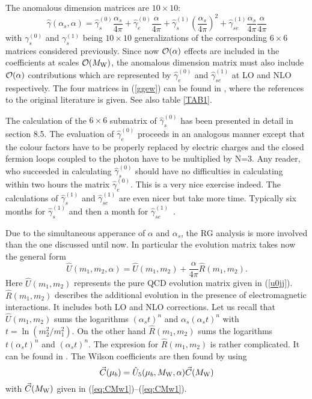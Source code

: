 \documentclass[12pt]{article}
\def\as{\alpha_s}
\newcommand{\mw}{M_{\rm W}}
\newcommand{\be}{\begin{equation}}
\newcommand{\ee}{\end{equation}}
\newcommand{\ord}{{\cal O}}
\def\aspi{\frac{\as}{4\pi}}
\begin{document}
\begin{itemize}
\begin{itemize}
The anomalous dimension matrices are $10\times 10$:
\begin{equation}\label{ggew}
\hat\gamma(\as,\alpha)=\hat\gamma_s^{(0)}\aspi + 
\hat\gamma_e^{(0)}\frac{\alpha}{4\pi}+ 
\hat\gamma_s^{(1)}\left(\aspi\right)^2+
\hat\gamma_{se}^{(1)}\aspi\frac{\alpha}{4\pi}
\end{equation}
with $\gamma_s^{(0)}$ and $\gamma_s^{(1)}$ being $10\times 10$
generalizations of the corresponding $6\times 6$ matrices considered
previously. Since now $\ord(\alpha)$ effects are included in the
coefficients at scales $\ord(\mw)$, the anomalous dimension matrix
must also include $\ord(\alpha)$ contributions which are represented
by $\hat\gamma_e^{(0)}$ and $\hat\gamma_{se}^{(1)}$ at LO and NLO
respectively. The four matrices in (\ref{ggew}) can be found in 
\cite{BBL}, where the references to the original literature is
given. See also table \ref{TAB1}.

The calculation of the $6\times 6$ submatrix of
$\hat\gamma_s^{(0)}$ has been presented in detail in section 8.5.
The evaluation of $\hat\gamma_e^{(0)}$ proceeds in an analogous
manner except that the colour factors have to be properly replaced
by electric charges and the closed fermion loops coupled to
the photon have to be multiplied by N=3. Any reader, who succeeded
in calculating
$\hat\gamma_s^{(0)}$ should have no difficulties in calculating
within two hours the matrix
$\hat\gamma_e^{(0)}$. This is a very nice exercise
indeed. 
The calculations of $\hat\gamma_s^{(1)}$ and $\hat\gamma_{se}^{(1)}$ 
are even nicer but take more time. Typically six months for
$\hat\gamma_s^{(1)}$ and then a month for
$\hat\gamma_{se}^{(1)}$~.

Due to the simultaneous apperance of $\alpha$ and $\alpha_s$, the
RG analysis is more involved than the one discussed until now. In
particular the evolution matrix takes now the general form
\be
\hat U(m_1,m_2,\alpha)=\hat U(m_1,m_2)+\frac{\alpha}{4\pi} \hat R(m_1,m_2).
\ee
Here $\hat U(m_1,m_2)$ represents the pure QCD evolution matrix given
in (\ref{u0jj}). $\hat R(m_1,m_2)$ describes the additional evolution
in the presence of electromagnetic interactions. 
It includes both LO and NLO corrections.
Let us recall that
$\hat U(m_1,m_2)$ sums the logarithms $(\as t)^n$ and $\as(\as t)^n$
with $t=\ln(m_2^2/m_1^2)$. On the other hand $\hat R(m_1,m_2)$ sums
the logarithms $t(\as t)^n$ and $(\as t)^n$. The expresion for
$\hat R(m_1,m_2)$ is rather complicated. It can be found in 
\cite{BBL,BJLW}.
The Wilson coefficients are then found by using
\be
\vec C(\mu_b)=\hat U_5(\mu_b,\mw,\alpha)\vec C(\mw)
\ee
with $\vec C(\mw)$ given in (\ref{eq:CMw1})--(\ref{eq:CMw1}).

\end{itemize}
\end{itemize}
\end{document}
